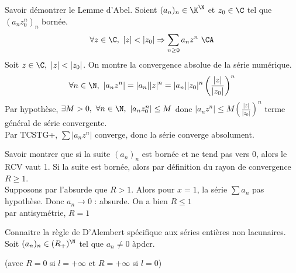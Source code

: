 \documentclass[french, 11pt]{article}
\begin{document}
\begin{exercice}{}{}
    Savoir démontrer le Lemme d'Abel.
    \tcblower
    Soient $(a_n)_n\in\K^\N$ et $z_0\in\C$ tel que $(a_nz_0^n)_n$ bornée.
    \begin{equation*}
        \forall z \in \C, ~ |z| < |z_0| \Rightarrow \sum_{n\geq0} a_nz^n ~ \CA
    \end{equation*}
    Soit $z\in\C, ~ |z|<|z_0|$. On montre la convergence absolue de la série numérique.
    \begin{equation*}
        \forall n \in \N, ~ |a_nz^n| = |a_n||z|^n = |a_n||z_0|^n\left(\frac{|z|}{|z_0|}\right)^n
    \end{equation*}
    Par hypothèse, $\exists M > 0, ~ \forall n \in \N, ~ |a_nz_0^n| \leq M$ donc $|a_nz^n|\leq M\left( \frac{|z|}{|z_0|} \right)^n$ terme général de série convergente.\\
    Par TCSTG+, $\sum|a_nz^n|$ converge, donc la série converge absolument.
\end{exercice}

\begin{exercice}{}{}
    Savoir montrer que si la suite $(a_n)_n$ est bornée et ne tend pas vers 0, alors le RCV vaut 1.
    \tcblower
    Si la suite est bornée, alors par définition du rayon de convergence $R \ge 1$.\\
    Supposons par l'absurde que $R > 1$. Alors pour $x = 1$, la série $\sum a_n$ pas hypothèse. Donc $a_n \to 0$ : absurde. On a bien $R \le 1$\\
    par antisymétrie, $R = 1$
\end{exercice}

\begin{exercice}{}{}
    Connaitre la règle de D'Alembert spécifique aux séries entières non lacunaires.
    \tcblower
    Soit $(a_n)_n \in (R_+)^\N$ tel que $a_n\neq0$ àpdcr.
    \begin{center}
    \end{center}
    (avec $R=0$ si $l = +\infty$ et $R=+\infty$ si $l = 0$)
\end{exercice}
\end{document}

